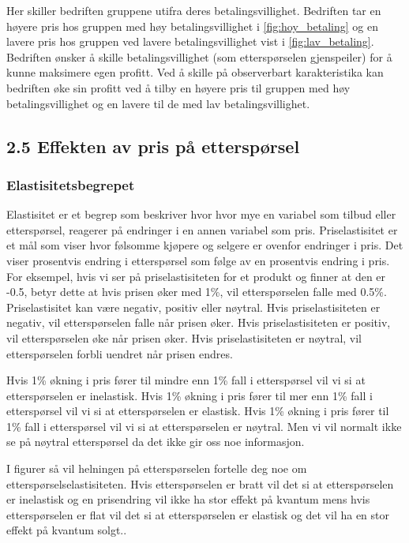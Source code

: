 \documentclass[
  12pt,
  a4paper,
  DIV=11,
  numbers=noendperiod]{scrartcl}
\begin{document}
Her skiller bedriften gruppene utifra deres betalingsvillighet.
Bedriften tar en høyere pris hos gruppen med høy betalingsvillighet i
\autoref{fig:hoy_betaling} og en lavere pris hos gruppen ved lavere
betalingsvillighet vist i \autoref{fig:lav_betaling}. Bedriften ønsker å
skille betalingsvillighet (som etterspørselen gjenspeiler) for å kunne
maksimere egen profitt. Ved å skille på observerbart karakteristika kan
bedriften øke sin profitt ved å tilby en høyere pris til gruppen med høy
betalingsvillighet og en lavere til de med lav betalingsvillighet.

\clearpage

\subsection{2.5 Effekten av pris på
etterspørsel}\label{effekten-av-pris-puxe5-etterspuxf8rsel}

\subsubsection{Elastisitetsbegrepet}\label{elastisitetsbegrepet}

Elastisitet er et begrep som beskriver hvor hvor mye en variabel som
tilbud eller etterspørsel, reagerer på endringer i en annen variabel som
pris. Priselastisitet er et mål som viser hvor følsomme kjøpere og
selgere er ovenfor endringer i pris. Det viser prosentvis endring i
etterspørsel som følge av en prosentvis endring i pris. For eksempel,
hvis vi ser på priselastisiteten for et produkt og finner at den er
-0.5, betyr dette at hvis prisen øker med 1\%, vil etterspørselen falle
med 0.5\%. Priselastisitet kan være negativ, positiv eller nøytral. Hvis
priselastisiteten er negativ, vil etterspørselen falle når prisen øker.
Hvis priselastisiteten er positiv, vil etterspørselen øke når prisen
øker. Hvis priselastisiteten er nøytral, vil etterspørselen forbli
uendret når prisen endres.

Hvis 1\% økning i pris fører til mindre enn 1\% fall i etterspørsel vil
vi si at etterspørselen er inelastisk. Hvis 1\% økning i pris fører til
mer enn 1\% fall i etterspørsel vil vi si at etterspørselen er elastisk.
Hvis 1\% økning i pris fører til 1\% fall i etterspørsel vil vi si at
etterspørselen er nøytral. Men vi vil normalt ikke se på nøytral
etterspørsel da det ikke gir oss noe informasjon.

I figurer så vil helningen på etterspørselen fortelle deg noe om
etterspørselselastisiteten. Hvis etterspørselen er bratt vil det si at
etterspørselen er inelastisk og en prisendring vil ikke ha stor effekt
på kvantum mens hvis etterspørselen er flat vil det si at etterspørselen
er elastisk og det vil ha en stor effekt på kvantum solgt..
\end{document}
